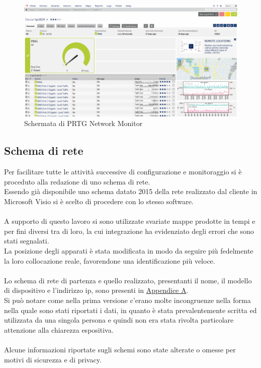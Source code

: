 \documentclass[Realizzazione.tex]{subfiles}
\begin{document}
\begin{figure}[H]
	\centering
	\includegraphics[width=0.8\linewidth]{"images/PRTGStatistics"}
	\caption{Schermata di PRTG Network Monitor}
	\label{fig:Schermata di PRTG Network Monitor}
\end{figure}

\subsection{Schema di rete}
Per facilitare tutte le attività successive di configurazione e monitoraggio si è proceduto alla redazione di uno schema di rete. \\
Essendo già disponibile uno schema datato 2015 della rete realizzato dal cliente in Microsoft Visio si è scelto di procedere con lo stesso software. \\\\
A supporto di questo lavoro si sono utilizzate svariate mappe prodotte in tempi e per fini diversi tra di loro, la cui integrazione ha evidenziato degli errori che sono stati segnalati. \\
La posizione degli apparati è stata modificata in modo da seguire più fedelmente la loro collocazione reale, favorendone una identificazione più veloce. \\\\
Lo schema di rete di partenza e quello realizzato, presentanti il nome, il modello di dispositivo e l'indirizzo ip, sono presenti in \hyperref[sec:Appendice A]{Appendice A}.\\
Si può notare come nella prima versione c'erano molte incongruenze nella forma nella quale sono stati riportati i dati, in quanto è stata prevalentemente scritta ed utilizzata da una singola persona e quindi non era stata rivolta particolare attenzione alla chiarezza espositiva. \\\\
Alcune informazioni riportate sugli schemi sono state alterate o omesse per motivi di sicurezza e di privacy. \\
\end{document}
